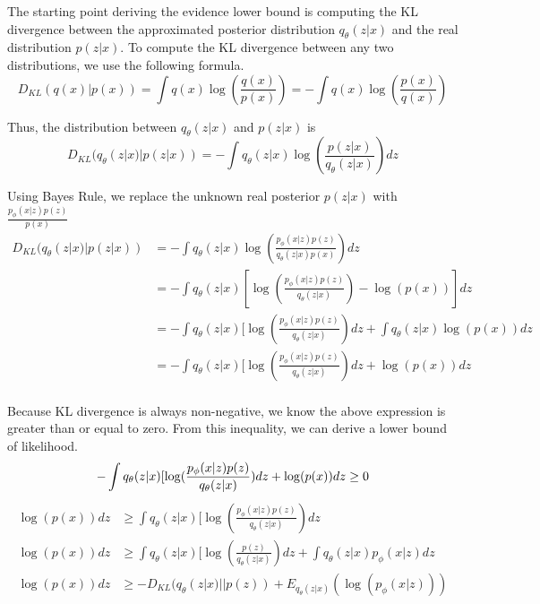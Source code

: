 \documentclass[./dissertation.tex]{subfiles}
\begin{document}
    The starting point deriving the evidence lower bound is computing the KL divergence between the approximated posterior distribution $q_{\theta}(z|x)$ and the real distribution $p(z|x)$. To compute the KL divergence between any two distributions, we use the following formula. 
    \begin{equation*}
        D_{KL}(q(x)|p(x)) = \int q(x)\log(\frac{q(x)}{p(x)}) = - \int q(x)\log(\frac{p(x)}{q(x)})
    \end{equation*}
    
    Thus, the distribution between $q_{\theta}(z|x)$ and $p(z|x)$ is
    \begin{equation*}
        D_{KL}(q_{\theta}(z|x)|p(z|x)) = - \int q_{\theta}(z|x)\log(\frac{p(z|x)}{q_{\theta}(z|x)})dz
    \end{equation*}
    
    Using Bayes Rule, we replace the unknown real posterior $p(z|x)$ with $\frac{p_{\phi}(x|z)p(z)}{p(x)}$
    \begin{equation*}
    \begin{aligned}
        D_{KL}(q_{\theta}(z|x)|p(z|x)) &= - \int q_{\theta}(z|x)\log(\frac{p_{\phi}(x|z)p(z)}{q_{\theta}(z|x)p(x)})dz \\
        &= - \int q_{\theta}(z|x)[\log(\frac{p_{\phi}(x|z)p(z)}{q_{\theta}(z|x)}) - \log(p(x))]dz \\
        &= - \int q_{\theta}(z|x)[\log(\frac{p_{\phi}(x|z)p(z)}{q_{\theta}(z|x)})dz + \int q_{\theta}(z|x)\log(p(x))dz \\
        &= - \int q_{\theta}(z|x)[\log(\frac{p_{\phi}(x|z)p(z)}{q_{\theta}(z|x)})dz + \log(p(x))dz \\
    \end{aligned}
    \end{equation*}
    
    Because KL divergence is always non-negative, we know the above expression is greater than or equal to zero. From this inequality, we can derive a lower bound of likelihood.
    \begin{equation*}
    - \int q_{\theta}(z|x)[\log(\frac{p_{\phi}(x|z)p(z)}{q_{\theta}(z|x)})dz + \log(p(x))dz \geq 0 \\
    \end{equation*}
    \begin{equation*}
    \begin{aligned}
    \log(p(x))dz &\geq \int q_{\theta}(z|x)[\log(\frac{p_{\phi}(x|z)p(z)}{q_{\theta}(z|x)})dz \\
    \log(p(x))dz &\geq \int q_{\theta}(z|x)[\log(\frac{p(z)}{q_{\theta}(z|x)})dz + \int q_{\theta}(z|x)p_{\phi}(x|z)dz \\
    \log(p(x))dz &\geq -D_{KL}(q_{\theta}(z|x)||p(z)) + E_{q_{\theta}(z|x)}(\log(p_{\phi}(x|z)))
    \end{aligned}
    \end{equation*}
    
\end{document}
